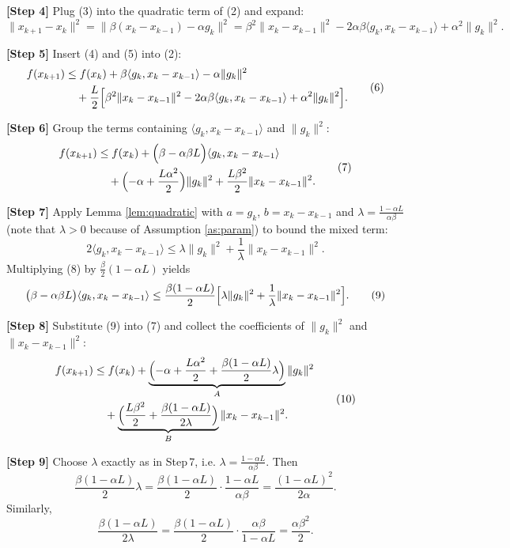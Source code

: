 \documentclass{article}
\begin{document}
\noindent\textbf{[Step 4]}  Plug (3) into the quadratic term of (2) and expand:
\[
\|x_{k+1}-x_k\|^2
= \|\beta (x_k-x_{k-1})-\alpha g_k\|^2
= \beta^{2}\|x_k-x_{k-1}\|^2-2\alpha\beta\langle g_k, x_k-x_{k-1}\rangle+\alpha^{2}\|g_k\|^2 .
\tag{5}
\]

\noindent\textbf{[Step 5]}  Insert (4) and (5) into (2):
\[
\begin{aligned}
f(x_{k+1}) &\le f(x_k)
+ \beta\langle g_k, x_k-x_{k-1}\rangle-\alpha\|g_k\|^2 \\
&\quad+\frac{L}{2}\Bigl[\beta^{2}\|x_k-x_{k-1}\|^2-2\alpha\beta\langle g_k, x_k-x_{k-1}\rangle+\alpha^{2}\|g_k\|^2\Bigr].
\end{aligned}
\tag{6}
\]

\noindent\textbf{[Step 6]}  Group the terms containing $\langle g_k, x_k-x_{k-1}\rangle$ and $\|g_k\|^2$:
\[
\begin{aligned}
f(x_{k+1}) &\le f(x_k)
+ \Bigl(\beta-\alpha\beta L\Bigr)\langle g_k, x_k-x_{k-1}\rangle \\
&\quad +\Bigl(-\alpha+\frac{L\alpha^{2}}{2}\Bigr)\|g_k\|^2
+\frac{L\beta^{2}}{2}\|x_k-x_{k-1}\|^2 .
\end{aligned}
\tag{7}
\]

\noindent\textbf{[Step 7]}  Apply Lemma \ref{lem:quadratic} with $a=g_k$, $b=x_k-x_{k-1}$ and $\lambda=\frac{1-\alpha L}{\alpha\beta}$ (note that $\lambda>0$ because of Assumption \ref{as:param}) to bound the mixed term:
\[
2\langle g_k, x_k-x_{k-1}\rangle
\le \lambda\|g_k\|^2+\frac{1}{\lambda}\|x_k-x_{k-1}\|^2 .
\tag{8}
\]
Multiplying (8) by $\frac{\beta}{2}(1-\alpha L)$ yields
\[
\bigl(\beta-\alpha\beta L\bigr)\langle g_k, x_k-x_{k-1}\rangle
\le \frac{\beta(1-\alpha L)}{2}\Bigl[\lambda\|g_k\|^2+\frac{1}{\lambda}\|x_k-x_{k-1}\|^2\Bigr].
\tag{9}
\]

\noindent\textbf{[Step 8]}  Substitute (9) into (7) and collect the coefficients of $\|g_k\|^2$ and $\|x_k-x_{k-1}\|^2$:
\[
\begin{aligned}
f(x_{k+1}) &\le f(x_k)
+\underbrace{\Bigl(-\alpha+\frac{L\alpha^{2}}{2}
+\frac{\beta(1-\alpha L)}{2}\lambda\Bigr)}_{A}\|g_k\|^2 \\
&\quad +\underbrace{\Bigl(\frac{L\beta^{2}}{2}
+\frac{\beta(1-\alpha L)}{2\lambda}\Bigr)}_{B}\|x_k-x_{k-1}\|^2 .
\end{aligned}
\tag{10}
\]

\noindent\textbf{[Step 9]}  Choose $\lambda$ exactly as in Step 7, i.e. $\lambda=\frac{1-\alpha L}{\alpha\beta}$.
Then
\[
\frac{\beta(1-\alpha L)}{2}\lambda
= \frac{\beta(1-\alpha L)}{2}\cdot\frac{1-\alpha L}{\alpha\beta}
= \frac{(1-\alpha L)^{2}}{2\alpha}.
\]
Similarly,
\[
\frac{\beta(1-\alpha L)}{2\lambda}
= \frac{\beta(1-\alpha L)}{2}\cdot\frac{\alpha\beta}{1-\alpha L}
= \frac{\alpha\beta^{2}}{2}.
\]
\end{document}
